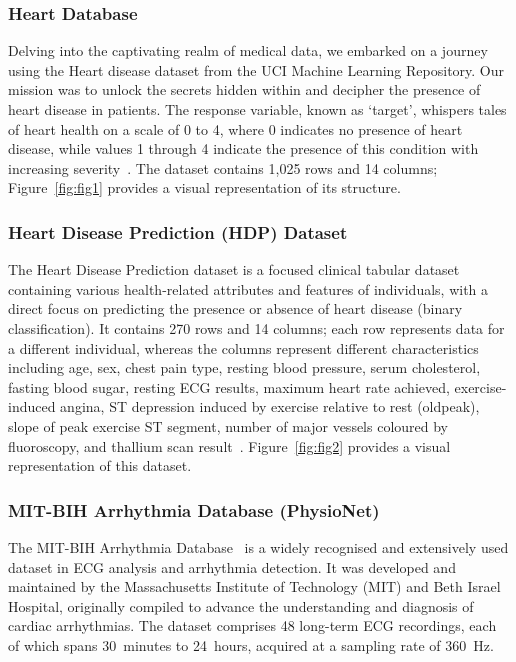\documentclass[10pt, twocolumn]{article}
\begin{document}
\subsubsection{Heart Database}

Delving into the captivating realm of medical data, we embarked on a journey using the
Heart disease dataset from the UCI Machine Learning Repository.
Our mission was to unlock the secrets hidden within and decipher the presence of heart
disease in patients.
The response variable, known as `target', whispers tales of heart health on a scale of 0 to 4,
where 0 indicates no presence of heart disease, while values 1 through 4 indicate the
presence of this condition with increasing severity~\cite{aicha2022}.
The dataset contains 1,025 rows and 14 columns; Figure~\ref{fig:fig1} provides a visual
representation of its structure.

\subsubsection{Heart Disease Prediction (HDP) Dataset}

The Heart Disease Prediction dataset is a focused clinical tabular dataset containing various
health-related attributes and features of individuals, with a direct focus on predicting the
presence or absence of heart disease (binary classification).
It contains 270 rows and 14 columns; each row represents data for a different individual,
whereas the columns represent different characteristics including age, sex, chest pain type,
resting blood pressure, serum cholesterol, fasting blood sugar, resting ECG results, maximum
heart rate achieved, exercise-induced angina, ST depression induced by exercise relative to
rest (oldpeak), slope of peak exercise ST segment, number of major vessels coloured by
fluoroscopy, and thallium scan result~\cite{aicha2022}.
Figure~\ref{fig:fig2} provides a visual representation of this dataset.

\subsubsection{MIT-BIH Arrhythmia Database (PhysioNet)}

The MIT-BIH Arrhythmia Database~\cite{physionet_mitdb} is a widely recognised and extensively
used dataset in ECG analysis and arrhythmia detection.
It was developed and maintained by the Massachusetts Institute of Technology (MIT) and
Beth Israel Hospital, originally compiled to advance the understanding and diagnosis of
cardiac arrhythmias.
The dataset comprises 48 long-term ECG recordings, each of which spans 30~minutes to
24~hours, acquired at a sampling rate of 360~Hz.
\end{document}
